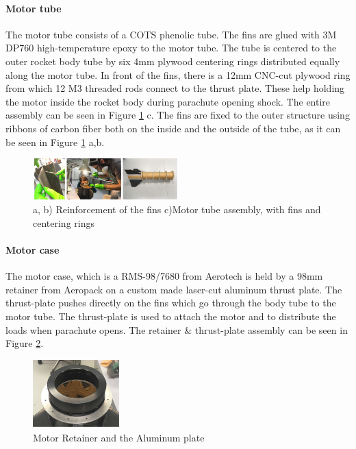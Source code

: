 \paragraph{Motor tube}
\hfill \break
The motor tube consists of a COTS phenolic tube. The fins are glued with 3M DP760 high-temperature epoxy to the motor tube. The tube is centered to the outer rocket body tube by six 4mm plywood centering rings distributed equally along the motor tube.
In front of the fins, there is a 12mm CNC-cut plywood ring from which 12 M3 threaded rods connect to the thrust plate. These help holding the motor inside the rocket body during parachute opening shock.
The entire assembly can be seen in Figure \ref{f:reinforcement} c. The fins are fixed to the outer structure using ribbons of carbon fiber both on the inside and the outside of the tube, as it can be seen in Figure \ref{f:reinforcement} a,b.

  \begin{figure}[h!]
\centering
\includegraphics[width=0.5\textwidth]{img/fins_glue.jpg}
\caption{a, b) Reinforcement of the fins c)Motor tube assembly, with fins and centering rings}
\label{f:reinforcement}
\end{figure}


\paragraph{Motor case}
\hfill \break
The motor case, which is a RMS-98/7680 from Aerotech is held by a 98mm retainer from Aeropack on a custom made laser-cut aluminum thrust plate. The thrust-plate pushes directly on the fins which go through the body tube to the motor tube. The thrust-plate is used to attach the motor and to distribute the loads when parachute opens.
 The retainer \& thrust-plate assembly can be seen in Figure \ref{f:motor_retainer_2}.
\begin{figure}[h!]
        \centering
        \includegraphics[width=0.3\textwidth]{img/motor_retainer.jpg}
        \caption{Motor Retainer and the Aluminum plate}
        \label{f:motor_retainer_2}
    \end{figure}


